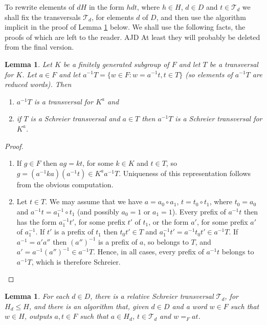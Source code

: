 \documentclass[a4paper,12pt]{article}
\newtheorem{lemma}[theorem]{Lemma}
\numberwithin{equation}{section}
\numberwithin{figure}{section}
\newcommand{\cT}{\mathcal{T}}
\newcommand{\be}{\begin{enumerate}}
\newcommand{\ee}{\end{enumerate}}
\newenvironment{ajd1}{\noindent\color{red} AJD }{}
\newcommand{\ajd}[1]{\begin{ajd1} #1 \end{ajd1}}
\begin{document}
To rewrite elements of $dH$ in the form $hdt$, where $h\in H$, 
$d\in D$ and $t\in \cT_d$ 
we shall fix the transversals $\cT_d$, for elements $d$ of $D$, and
then use the algorithm implicit in the proof of Lemma \ref{lem:reltran}
below. We shall use the following facts, the proofs of which
are left to the reader. \ajd{At least they will probably be deleted 
from  the final version.}
\begin{lemma}\label{lem:conjtran}
Let $K$ be a finitely generated subgroup of $F$ and let $T$ be
a transversal for $K$. Let $a\in F$ and let 
$a^{-1}T=\{w\in F:w=a^{-1}t, t\in T\}$ 
(so elements of $a^{-1}T$ are reduced words). 
  Then 
\be
\item $a^{-1}T$ is a transversal for $K^a$ and 
\item if $T$ is a Schreier transversal and $a\in T$ 
then $a^{-1}T$ is a Schreier  transversal for $K^a$.
\ee
\end{lemma}
\begin{proof}
\be
\item If $g\in F$ then $ag=kt$, for some $k\in K$ and $t\in T$, 
so $g=(a^{-1}ka)(a^{-1}t)\in K^aa^{-1}T$. Uniqueness of this representation
follows from the obvious computation.
\item Let $t\in T$. 
We may assume that we have $a=a_0\circ a_1$, $t=t_0\circ t_1$, where
$t_0=a_0$ and $a^{-1}t=a_1^{-1}\circ t_1$ (and possibly $a_0=1$ or $a_1=1$).  
Every prefix of $a^{-1}t$ then has the form $a_1^{-1}t'$, for 
some prefix $t'$ of $t_1$, or the form $a'$, for some prefix $a'$ of 
$a_1^{-1}$.  If $t'$ is a prefix of $t_1$ then $t_0t'\in T$ and 
$a_1^{-1}t'=  a^{-1}t_0t'\in a^{-1}T$. If $a^{-1}=a'a''$ then 
$(a'')^{-1}$ is a prefix of $a$, so belongs to $T$, and $a'=a^{-1}(a'')^{-1}
\in a^{-1}T$. Hence, in all cases, every prefix of $a^{-1}t$ belongs
to $a^{-1}T$, which is therefore Schreier.
\ee
\end{proof}
\begin{lemma}\label{lem:reltran}
For each $d\in D$, there is a 
relative Schreier transversal $\cT_d$, for $H_d\le H$, and there is  
 an algorithm that, given $d\in D$ and a word $w \in F$ such that 
$w\in H$, outputs $a,t\in F$ such that $a\in H_d$, $t\in \cT_d$ and 
$w=_F at$. 
\end{lemma}
\end{document}
